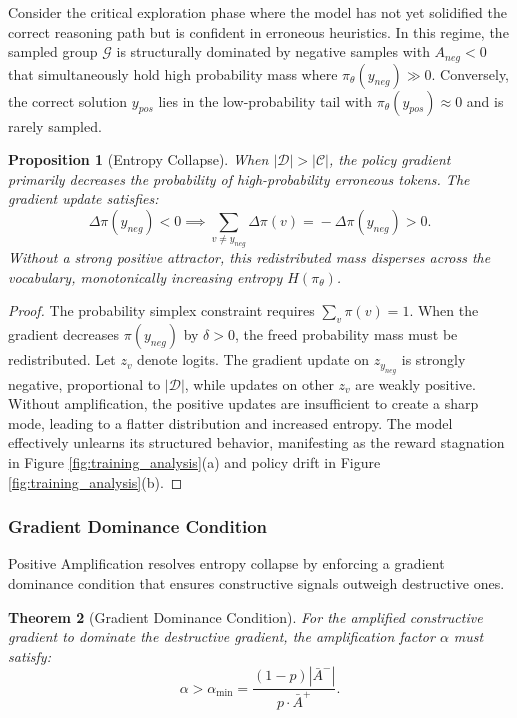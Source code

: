 \documentclass{article} %
\newtheorem{theorem}{Theorem}
\newtheorem{proposition}[theorem]{Proposition}
\theoremstyle{definition}
\theoremstyle{remark}
\begin{document}
Consider the critical exploration phase where the model has not yet solidified the correct reasoning path but is confident in erroneous heuristics. In this regime, the sampled group $\mathcal{G}$ is structurally dominated by negative samples with $A_{neg} < 0$ that simultaneously hold high probability mass where $\pi_\theta(y_{neg}) \gg 0$. Conversely, the correct solution $y_{pos}$ lies in the low-probability tail with $\pi_\theta(y_{pos}) \approx 0$ and is rarely sampled.

\begin{proposition}[Entropy Collapse]
\label{prop:entropy_collapse}
When $|\mathcal{D}| > |\mathcal{C}|$, the policy gradient primarily decreases the probability of high-probability erroneous tokens. The gradient update satisfies:
\begin{equation}
\Delta\pi(y_{neg}) \!\! < \!\! 0 \!\! \implies \!\! \sum_{v \neq y_{neg}} \!\! \Delta\pi(v) \!\! = \!\! -\Delta\pi(y_{neg}) \!\! > \!\! 0 .
\end{equation}
Without a strong positive attractor, this redistributed mass disperses across the vocabulary, monotonically increasing entropy $H(\pi_\theta)$.
\end{proposition}

\begin{proof}
The probability simplex constraint requires $\sum_v \pi(v) = 1$. When the gradient decreases $\pi(y_{neg})$ by $\delta > 0$, the freed probability mass must be redistributed. Let $z_v$ denote logits. The gradient update on $z_{y_{neg}}$ is strongly negative, proportional to $|\mathcal{D}|$, while updates on other $z_v$ are weakly positive. Without amplification, the positive updates are insufficient to create a sharp mode, leading to a flatter distribution and increased entropy. The model effectively unlearns its structured behavior, manifesting as the reward stagnation in Figure \ref{fig:training_analysis}(a) and policy drift in Figure \ref{fig:training_analysis}(b).
\end{proof}

\subsubsection{Gradient Dominance Condition}
\label{sec:gradient_dominance}

Positive Amplification resolves entropy collapse by enforcing a gradient dominance condition that ensures constructive signals outweigh destructive ones.

\begin{theorem}[Gradient Dominance Condition]
\label{thm:gradient_dominance}
For the amplified constructive gradient to dominate the destructive gradient, the amplification factor $\alpha$ must satisfy:
\begin{equation}
\alpha > \alpha_{\min} = \frac{(1-p)|\bar{A}^-|}{p \cdot \bar{A}^+}.
\end{equation}
\end{theorem}
\end{document}
